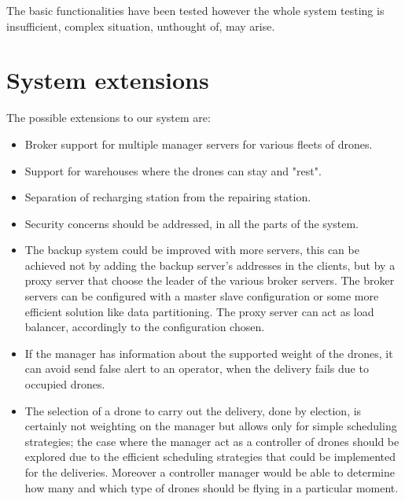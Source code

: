 \documentclass[a4paper, oneside]{memoir}
\begin{document}
The basic functionalities have been tested however the whole system testing is insufficient, complex situation, unthought of, may arise.

\section{System extensions}
The possible extensions to our system are:
\begin{itemize}
	\item Broker support for multiple manager servers for various fleets of drones.
	\item Support for warehouses where the drones can stay and "rest".
	\item Separation of recharging station from the repairing station.
	\item Security concerns should be addressed, in all the parts of the system.
	\item The backup system could be improved with more servers, this can be achieved not by adding the backup server's addresses in the clients, but by a proxy server that choose the leader of the various broker servers. The broker servers can be configured with a master slave configuration or some more efficient solution like data partitioning. The proxy server can act as load balancer, accordingly to the configuration chosen.
	\item If the manager has information about the supported weight of the drones, it can avoid send false alert to an operator, when the delivery fails due to occupied drones.
	\item The selection of a drone to carry out the delivery, done by election, is certainly not weighting on the manager but allows only for simple scheduling strategies; the case where the manager act as a controller of drones should be explored due to the efficient scheduling strategies that could be implemented for the deliveries. Moreover a controller manager would be able to determine how many and which type of drones should be flying in a particular moment.
\end{itemize}
\end{document}
